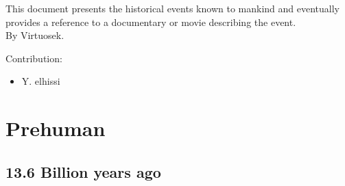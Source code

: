 \documentclass[11pt]{report}
\begin{document}
\begin{center}
\vspace*{\fill}
This document presents the historical events known to mankind and eventually provides a reference to a documentary or movie describing the event.\\
By Virtuosek.\\ \vspace{5cm}
\end{center}

Contribution: 
\begin{itemize}
\item Y. elhissi
\end{itemize}

\vspace*{\fill}
\pagebreak

\tableofcontents
\pagebreak
\setcounter{secnumdepth}{5}

										
		

\part{Prehuman}
\chapter{13.6 Billion years ago}
\end{document}
